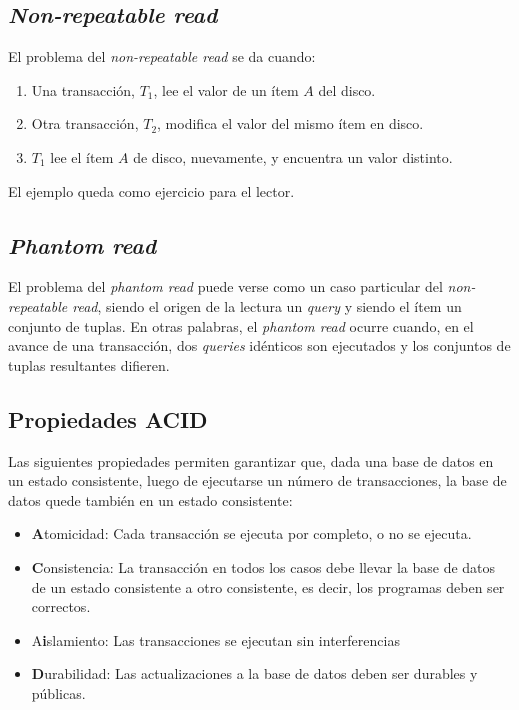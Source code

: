 \documentclass[english]{article}
\theoremstyle{definition}
\theoremstyle{definition}
\begin{document}
\subsection{\emph{Non-repeatable read}}

El problema del \emph{non-repeatable read} se da cuando:
\begin{enumerate}
    \item Una transacción, $T_1$, lee el valor de un ítem $A$ del disco.
    \item Otra transacción, $T_2$, modifica el valor del mismo ítem en disco.
    \item $T_1$ lee el ítem $A$ de disco, nuevamente, y encuentra un valor
        distinto.
\end{enumerate}

El ejemplo queda como ejercicio para el lector.

\subsection{\emph{Phantom read}}

El problema del \emph{phantom read} puede verse como un caso particular del
\emph{non-repeatable read}, siendo el origen de la lectura un \emph{query} y
siendo el ítem un conjunto de tuplas. En otras palabras, el
\emph{phantom read} ocurre cuando, en el avance de una transacción, dos
\emph{queries} idénticos son ejecutados y los conjuntos de tuplas resultantes
difieren.


\subsection{Propiedades ACID}

Las siguientes propiedades permiten garantizar que, dada una base de datos en
un estado consistente, luego de ejecutarse un número de transacciones, la base
de datos quede también en un estado consistente:

\begin{itemize}
    \item \textbf{A}tomicidad: Cada transacción se ejecuta por completo, o no
        se ejecuta.
    \item \textbf{C}onsistencia: La transacción en todos los casos debe llevar
        la base de datos de un estado consistente a otro consistente, es
        decir, los programas deben ser correctos.
    \item A\textbf{i}slamiento: Las transacciones se ejecutan sin
        interferencias
    \item \textbf{D}urabilidad: Las actualizaciones a la base de datos deben
        ser durables y públicas.
\end{itemize}
\end{document}
